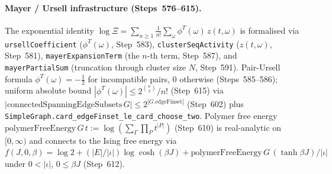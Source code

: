 \documentclass[a4paper,11pt]{article}
\begin{document}
\paragraph{Mayer / Ursell infrastructure (Steps~576--615).}
The exponential identity $\log \Xi = \sum_{n \ge 1} \frac{1}{n!}
\sum_{\omega} \phi^T(\omega)\, z(t,\omega)$ is formalised via
\texttt{ursellCoefficient} (\(\phi^T(\omega)\),
Step~583), \texttt{clusterSeqActivity} (\(z(t,\omega)\),
Step~581), \texttt{mayerExpansionTerm} (the $n$-th term,
Step~587), and \texttt{mayerPartialSum} (truncation through
cluster size $N$, Step~591). Pair-Ursell formula
$\phi^T(\omega) = -\tfrac{1}{2}$ for incompatible pairs,
$0$ otherwise (Steps~585--586); uniform absolute bound
$|\phi^T(\omega)| \le 2^{\binom{n}{2}}/n!$ (Step~615) via
$|\mathrm{connectedSpanningEdgeSubsets}\,G| \le 2^{|G.\mathrm{edgeFinset}|}$
(Step~602) plus
\texttt{SimpleGraph.card\_edgeFinset\_le\_card\_choose\_two}.
Polymer free energy
$\mathrm{polymerFreeEnergy}\,G\,t := \log(\sum_\Gamma \prod_P t^{|P|})$
(Step~610) is real-analytic on $[0,\infty)$ and connects to the
Ising free energy via
$f(J,0,\beta) = \log 2 + (|E|/|\iota|) \log\cosh(\beta J)
  + \mathrm{polymerFreeEnergy}\,G\,(\tanh \beta J)/|\iota|$
under $0 < |\iota|$, $0 \le \beta J$ (Step~612).
\end{document}
